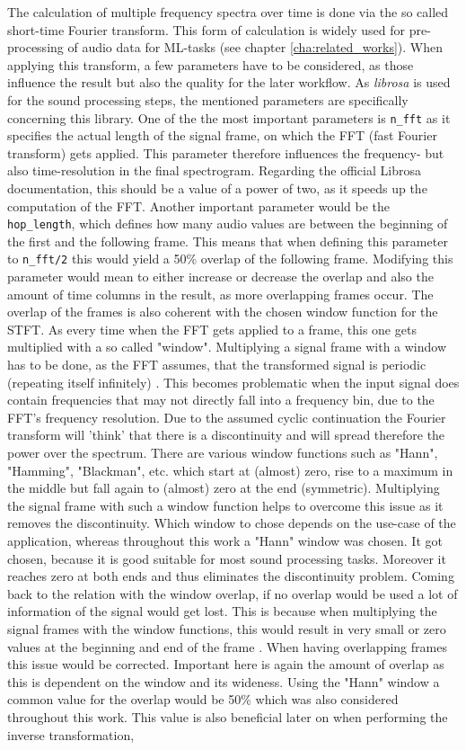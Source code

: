 The calculation of multiple frequency spectra over time is done via the so called short-time Fourier transform. This form of calculation is widely used for pre-processing of audio data for ML-tasks (see chapter \ref{cha:related_works}). When applying this transform, a few parameters have to be considered, as those influence the result but also the quality for the later workflow. As \textit{librosa} is used for the sound processing steps, the mentioned parameters are specifically concerning this library. One of the the most important parameters is \texttt{n\_fft} as it specifies the actual length of the signal frame, on which the FFT (fast Fourier transform) gets applied. This parameter therefore influences the frequency- but also time-resolution in the final spectrogram. Regarding the official Librosa documentation, this should be a value of a power of two, as it speeds up the computation of the FFT. Another important parameter would be the \texttt{hop\_length}, which defines how many audio values are between the beginning of the first and the following frame. This means that when defining this parameter to \texttt{n\_fft/2} this would yield a 50\% overlap of the following frame. Modifying this parameter would mean to either increase or decrease the overlap and also the amount of time columns in the result, as more overlapping frames occur. The overlap of the frames is also coherent with the chosen window function for the STFT. As every time when the FFT gets applied to a frame, this one gets multiplied with a so called "window". Multiplying a signal frame with a window has to be done, as the FFT assumes, that the transformed signal is periodic (repeating itself infinitely) \cite{heinzel2002spectrum}. This becomes problematic when the input signal does contain frequencies that may not directly fall into a frequency bin, due to the FFT's frequency resolution. Due to the assumed cyclic continuation the Fourier transform will 'think' that there is a discontinuity and will spread therefore the power over the spectrum. There are various window functions such as "Hann", "Hamming", "Blackman", etc. which start at (almost) zero, rise to a maximum in the middle but fall again to (almost) zero at the end (symmetric). Multiplying the signal frame with such a window function helps to overcome this issue as it removes the discontinuity. Which window to chose depends on the use-case of the application, whereas throughout this work a "Hann" window was chosen. It got chosen, because it is good suitable for most sound processing tasks. Moreover it reaches zero at both ends and thus eliminates the discontinuity problem. Coming back to the relation with the window overlap, if no overlap would be used a lot of information of the signal would get lost. This is because when multiplying the signal frames with the window functions, this would result in very small or zero values at the beginning and end of the frame \cite{heinzel2002spectrum}. When having overlapping frames this issue would be corrected. Important here is again the amount of overlap as this is dependent on the window and its wideness. Using the "Hann" window a common value for the overlap would be 50\% which was also considered throughout this work. This value is also beneficial later on when performing the inverse transformation, 